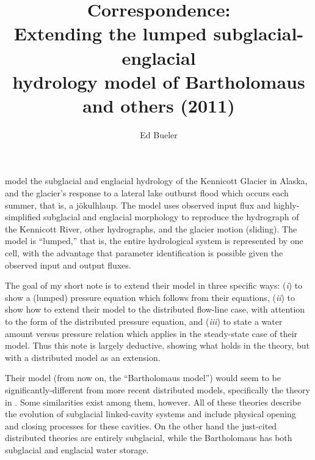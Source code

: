 \documentclass[twocolumn,letterpaper]{igs}
\begin{document}
\title[Correspondence: Extending the Bartholomaus hydrology model]{Correspondence: \\ Extending the lumped subglacial-englacial \\ hydrology model of Bartholomaus and others (2011)}

\author{Ed Bueler}



\maketitle

\cite{Bartholomausetal2011} model the subglacial and englacial hydrology of the Kennicott Glacier in Alaska, and the glacier's response to a lateral lake outburst flood which occurs each summer, that is, a j\"okulhlaup.  The model uses observed input flux and highly-simplified subglacial and englacial morphology to reproduce the hydrograph of the Kennicott River, other hydrographs, and the glacier motion (sliding).  The model is ``lumped,'' that is, the entire hydrological system is represented by one cell, with the advantage that parameter identification is possible given the observed input and output fluxes.

The goal of my short note is to extend their model in three specific ways: (\emph{i}) to show a (lumped) pressure equation which follows from their equations, (\emph{ii}) to show how to extend their model to the distributed flow-line case, with attention to the form of the distributed pressure equation, and (\emph{iii}) to state a water amount versus pressure relation which applies in the steady-state case of their model.  Thus this note is largely deductive, showing what holds in the \cite{Bartholomausetal2011} theory, but with a distributed model as an extension.

Their model (from now on, the ``Bartholomaus model'') would seem to be significantly-different from more recent distributed models, specifically the theory in \citep{Hewitt2011,Schoofetal2012,Hewittetal2012}.  Some similarities exist among them, however.  All of these theories describe the evolution of subglacial linked-cavity systems and include physical opening and closing processes for these cavities.  On the other hand the just-cited distributed theories are entirely subglacial, while the Bartholomaus has both subglacial and englacial water storage.  
\end{document}
